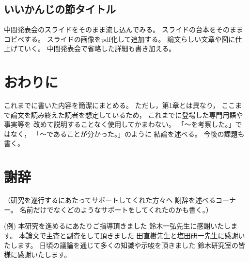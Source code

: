 \documentclass[12pt,a4paper,oneside]{jsbook}
\theoremstyle{plain}
\begin{document}
\section{いいかんじの節タイトル}
中間発表会のスライドをそのまま流し込んでみる。
スライドの台本をそのままコピペする。
スライドの画像をpdf化して追加する。
論文らしい文章や図に仕上げていく。
中間発表会で省略した詳細も書き加える。


\chapter{おわりに}
\label{chapter_5}
これまでに書いた内容を簡潔にまとめる。
ただし，第1章とは異なり，
ここまで論文を読み終えた読者を想定しているため，
これまでに登場した専門用語や事実等を
改めて説明することなく使用してかまわない。
「～を考察した。」ではなく，
「～であることが分かった。」のように
結論を述べる。
今後の課題も書く。


\chapter*{謝辞}
（研究を遂行するにあたってサポートしてくれた方々へ
謝辞を述べるコーナー。
名前だけでなくどのようなサポートをしてくれたのかも書く。）

(例)
本研究を進めるにあたりご指導頂きました
鈴木一弘先生に感謝いたします。
本論文で主査と副査をして頂きました
田直樹先生と塩田研一先生に感謝いたします。
日頃の議論を通じて多くの知識や示唆を頂きました
鈴木研究室の皆様に感謝いたします。
\end{document}
